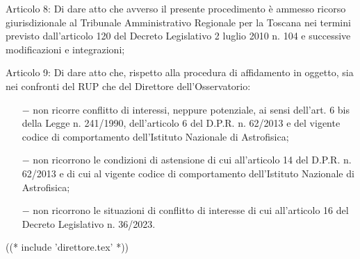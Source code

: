 \documentclass[a4paper,12pt]{letter}
\begin{document}
Articolo 8: Di dare atto che avverso il presente procedimento è ammesso
ricorso giurisdizionale al Tribunale Amministrativo Regionale per la
Toscana nei termini previsto dall’articolo 120 del Decreto Legislativo
2 luglio 2010 n. 104 e successive modificazioni e integrazioni;

Articolo 9: Di dare atto che, rispetto alla procedura di affidamento in
oggetto, sia nei confronti del RUP che del Direttore dell’Osservatorio:

\begin{itemize}

\item[$-$]  non ricorre conflitto di interessi, neppure potenziale, ai
sensi dell’art. 6 bis della Legge n. 241/1990, dell’articolo 6 del
D.P.R. n. 62/2013 e del vigente codice di comportamento dell’Istituto
Nazionale di Astrofisica;

\item[$-$]  non ricorrono le condizioni di astensione di cui
all’articolo 14 del D.P.R. n. 62/2013 e di cui al vigente codice di
comportamento dell’Istituto Nazionale di Astrofisica;

\item[$-$] non ricorrono le situazioni di conflitto di interesse di cui
all’articolo 16 del Decreto Legislativo n. 36/2023.

\end{itemize}

((* include 'direttore.tex' *))
\end{document}
